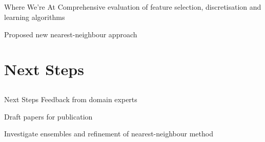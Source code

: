 \documentclass[compress]{beamer}
\begin{document}
\subsection{}
\begin{frame}{Where We're At}
Comprehensive evaluation of feature selection, discretisation and learning algorithms
\pause

\vspace{0.5cm}
Proposed new nearest-neighbour approach
\end{frame}

\section{Next Steps}
\subsection{}
\begin{frame}{Next Steps}
Feedback from domain experts

\pause
\vspace{0.5cm}
Draft papers for publication
\pause

\vspace{0.5cm}
Investigate ensembles and refinement of nearest-neighbour method
\end{frame}
\end{document}
